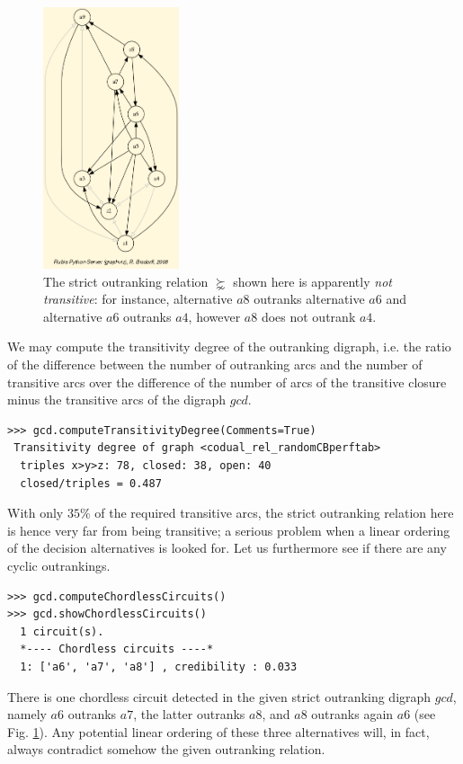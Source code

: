 \begin{figure}[h]
\sidecaption
\includegraphics[width=4cm]{Figures/rankingTutorial.png}
\caption{The strict outranking relation $\succnsim$ shown here is apparently \emph{not transitive}: for instance, alternative $a8$ outranks alternative $a6$ and alternative $a6$ outranks $a4$, however $a8$ does not outrank $a4$.}
\label{fig:8.1}       %
\end{figure}

We may compute the transitivity degree of the outranking digraph, i.e. the ratio of the difference between the number of outranking arcs and the number of transitive arcs over the difference of the number of arcs of the transitive closure minus the transitive arcs of the digraph $gcd$.

\begin{lstlisting}
>>> gcd.computeTransitivityDegree(Comments=True)
 Transitivity degree of graph <codual_rel_randomCBperftab>
  triples x>y>z: 78, closed: 38, open: 40
  closed/triples = 0.487
\end{lstlisting}    

With only $35\%$ of the required transitive arcs, the strict outranking relation here is hence very far from being transitive; a serious problem when a linear ordering of the decision alternatives is looked for. Let us furthermore see if there are any cyclic outrankings.
    
\begin{lstlisting}
>>> gcd.computeChordlessCircuits()
>>> gcd.showChordlessCircuits()
  1 circuit(s).
  *---- Chordless circuits ----*    
  1: ['a6', 'a7', 'a8'] , credibility : 0.033
\end{lstlisting}

There is one chordless circuit detected in the given strict outranking digraph $gcd$, namely $a6$ outranks $a7$, the latter outranks $a8$, and $a8$ outranks again $a6$ (see Fig. \ref{fig:8.1}). Any potential linear ordering of these three alternatives will, in fact, always contradict somehow the given outranking relation.

